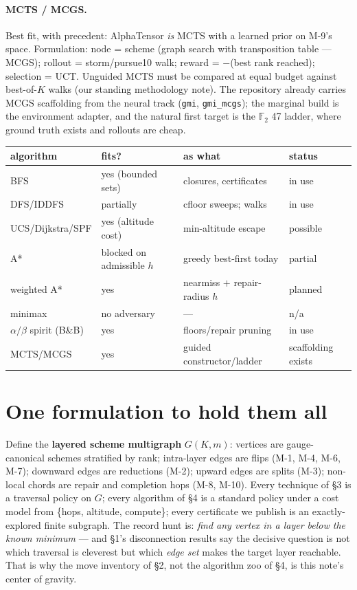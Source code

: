 \documentclass[10pt]{article}
\begin{document}
\paragraph{MCTS / MCGS.} Best fit, with precedent: AlphaTensor
\emph{is} MCTS with a learned prior on M-9's space. Formulation:
node = scheme (graph search with transposition table --- MCGS);
rollout = storm/pursue10 walk; reward = $-$(best rank reached);
selection = UCT. Unguided MCTS must be compared at equal budget
against best-of-$K$ walks (our standing methodology note). The
repository already carries MCGS scaffolding from the neural track
(\texttt{gmi}, \texttt{gmi\_mcgs}); the marginal build is the
environment adapter, and the natural first target is the
$\mathbb{F}_2$ 47 ladder, where ground truth exists and rollouts
are cheap.

\begin{center}\small
\begin{tabular}{llll}
\toprule
algorithm & fits? & as what & status\\
\midrule
BFS & yes (bounded sets) & closures, certificates & in use\\
DFS/IDDFS & partially & cfloor sweeps; walks & in use\\
UCS/Dijkstra/SPF & yes (altitude cost) & min-altitude escape & possible\\
A* & blocked on admissible $h$ & greedy best-first today & partial\\
weighted A* & yes & nearmiss $+$ repair-radius $h$ & planned\\
minimax & no adversary & --- & n/a\\
$\alpha/\beta$ spirit (B\&B) & yes & floors/repair pruning & in use\\
MCTS/MCGS & yes & guided constructor/ladder & scaffolding exists\\
\bottomrule
\end{tabular}
\end{center}

\section{One formulation to hold them all}

Define the \textbf{layered scheme multigraph} $G(K,m)$: vertices
are gauge-canonical schemes stratified by rank; intra-layer edges
are flips (M-1, M-4, M-6, M-7); downward edges are reductions
(M-2); upward edges are splits (M-3); non-local chords are repair
and completion hops (M-8, M-10). Every technique of \S3 is a
traversal policy on $G$; every algorithm of \S4 is a standard
policy under a cost model from \{hops, altitude, compute\}; every
certificate we publish is an exactly-explored finite subgraph. The
record hunt is: \emph{find any vertex in a layer below the known
minimum} --- and \S1's disconnection results say the decisive
question is not which traversal is cleverest but which \emph{edge
set} makes the target layer reachable. That is why the move
inventory of \S2, not the algorithm zoo of \S4, is this note's
center of gravity.
\end{document}
